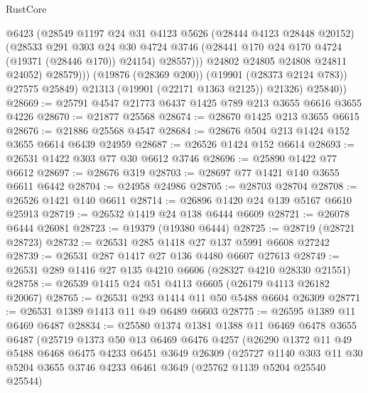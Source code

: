 \begin{lexlean}{RustCore}
\begin{coremodule}
                      @6423
                      (@28549
                        @1197
                        @24
                        @31
                        @4123
                        @5626
                        (@28444 @4123 @28448 @20152)
                        (@28533
                          @291
                          @303
                          @24
                          @30
                          @4724
                          @3746
                          (@28441 @170 @24 @170 @4724 (@19371 (@28446 @170)) @24154)
                          @28557)))
                    @24802
                    @24805
                    @24808
                    @24811
                    @24052)
                  @28579)))
            (@19876 (@28369 @200))
            (@19901 (@28373 @2124 @783))
            @27575
            @25849)
          @21313
          (@19901 (@22171 @1363 @2125))
          @21326)
        @25840))
@28669 := @25791 @4547 @21773 @6437 @1425 @789 @213 @3655 @6616 @3655 @4226
@28670 := @21877 @25568
@28674 := @28670 @1425 @213 @3655 @6615
@28676 := @21886 @25568 @4547
@28684 := @28676 @504 @213 @1424 @152 @3655 @6614 @6439 @24959
@28687 := @26526 @1424 @152 @6614
@28693 := @26531 @1422 @303 @77 @30 @6612 @3746
@28696 := @25890 @1422 @77 @6612
@28697 := @28676 @319
@28703 := @28697 @77 @1421 @140 @3655 @6611 @6442
@28704 := @24958 @24986
@28705 := @28703 @28704
@28708 := @26526 @1421 @140 @6611
@28714 := @26896 @1420 @24 @139 @5167 @6610 @25913
@28719 := @26532 @1419 @24 @138 @6444 @6609
@28721 := @26078 @6444 @26081
@28723 := @19379 (@19380 @6444)
@28725 := @28719 (@28721 @28723)
@28732 := @26531 @285 @1418 @27 @137 @5991 @6608 @27242
@28739 := @26531 @287 @1417 @27 @136 @4480 @6607 @27613
@28749 := @26531 @289 @1416 @27 @135 @4210 @6606 (@28327 @4210 @28330 @21551)
@28758 := @26539 @1415 @24 @51 @4113 @6605 (@26179 @4113 @26182 @20067)
@28765 := @26531 @293 @1414 @11 @50 @5488 @6604 @26309
@28771 := @26531 @1389 @1413 @11 @49 @6489 @6603
@28775 := @26595 @1389 @11 @6469 @6487
@28834 := @25580
    @1374
    @1381
    @1388
    @11
    @6469
    @6478
    @3655
    @6487
    (@25719
      @1373
      @50
      @13
      @6469
      @6476
      @4257
      (@26290
        @1372
        @11
        @49
        @5488
        @6468
        @6475
        @4233
        @6451
        @3649
        @26309
        (@25727
          @1140
          @303
          @11
          @30
          @5204
          @3655
          @3746
          @4233
          @6461
          @3649
          (@25762 @1139 @5204 @25540 @25544)

\end{coremodule}
\end{lexlean}
